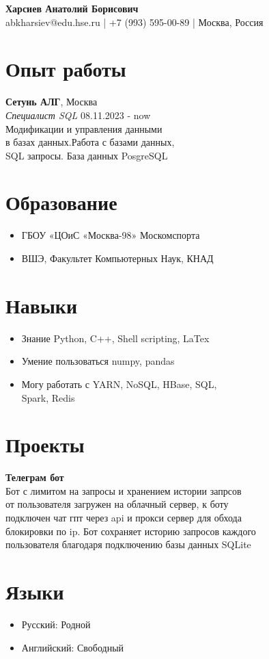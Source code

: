 \documentclass[a4paper,12pt]{article}
\begin{document}
\begin{center}
    \Huge\textbf{{Харсиев Анатолий Борисович}}\\
    \normalsize{abkharsiev@edu.hse.ru | +7 (993) 595-00-89 | Москва, Россия}
\end{center}

\section*{Опыт работы}
\large{
\textbf{Сетунь АЛГ}, Москва \\
\emph{Специалист SQL} \hfill 08.11.2023 - now \\
Модификации и управления данными\\
в базах данных.Работа с базами данных,\\
SQL запросы. База данных PosgreSQL}



\section*{Образование}
\begin{itemize}
    \item ГБОУ «ЦОиС «Москва-98» Москомспорта
    \item ВШЭ, Факультет Компьютерных Наук, КНАД
\end{itemize}
 

\section*{Навыки}
\begin{itemize}
    \item Знание Python, C++, Shell scripting, LaTex
    \item Умение пользоваться numpy, pandas
    \item Могу работать с YARN, NoSQL, HBase, SQL,\\
    Spark, Redis
\end{itemize}

\section*{Проекты}
\textbf{Телеграм бот} \\
\large{Бот с лимитом на запросы и хранением истории запрсов\\
от пользователя загружен на облачный сервер, к боту\\
подключен чат гпт через api и прокси сервер для обхода \\
блокировки по ip. Бот сохраняет историю запросов каждого\\
пользователя благодаря подключению базы данных SQLite}

\section*{Языки}
\begin{itemize}
    \item Русский: Родной
    \item Английский: Свободный 
\end{itemize}
\end{document}
